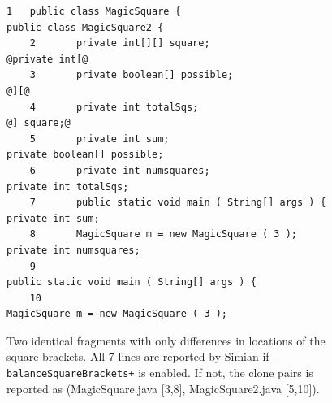 \documentclass{sig-alternate-05-2015}
\begin{document}
\noindent\begin{figure}
	\scriptsize
	\begin{lstlisting}[frame=single,style=base]
	1   public class MagicSquare {                           public class MagicSquare2 {
	2       private int[][] square;                              @private int[@
	3       private boolean[] possible;                                      @][@
	4       private int totalSqs;                                            @] square;@
	5       private int sum;                                     private boolean[] possible;
	6       private int numsquares;                              private int totalSqs;
	7       public static void main ( String[] args ) {          private int sum;
	8       MagicSquare m = new MagicSquare ( 3 );               private int numsquares;
	9                                                            public static void main ( String[] args ) {
	10                                                           MagicSquare m = new MagicSquare ( 3 );
	\end{lstlisting}
	\caption{Two identical fragments with only differences in locations of the square brackets. All 7 lines are reported by Simian if \small\texttt{-balanceSquareBrackets+} \normalsize is enabled. If not, the clone pairs is reported as \newline (MagicSquare.java [3,8], MagicSquare2.java [5,10]).} 
	\label{fig:two_frags}
\end{figure}
\end{document}
